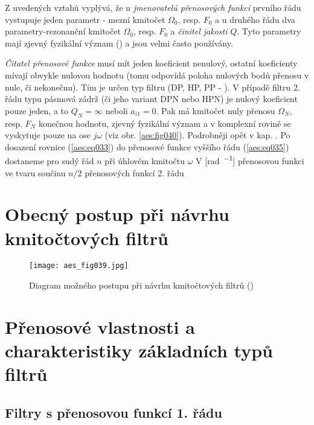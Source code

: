           Z uvedených vztahů vyplývá, že u \emph{jmenovatelů přenosových funkcí} prvního řádu
          vystupuje jeden parametr - mezní kmitočet \(\Omega_0\), resp. \(F_0\) a u druhého řádu dva
          parametry-rezonanční kmitočet \(\Omega_0\), resp. \(F_0\) a \emph{činitel jakosti} \(Q\).
          Tyto parametry mají zjevný fyzikální význam () a jsou velmi často
          používány. 
          
          \emph{Čitatel přenosové funkce} musí mít jeden koeficient nenulový, ostatní koeficienty
          mívají obvykle nulovou hodnotu (tomu odpovídá poloha nulových bodů přenosu v nule, či
          nekonečnu). Tím je určen typ filtru (DP, HP, PP - ). V případě filtru
          2. řádu typu pásmová zádrž (či jeho variant DPN nebo HPN) je nulový koeficient pouze
          jeden, a to \(Q_N = \infty\) neboli \(a_{i1} = 0\). Pak má kmitočet nuly přenosu
          \(\Omega_N\), resp. \(F_N\) konečnou hodnotu, zjevný fyzikální význam a v komplexní rovině
          se vyskytuje pouze na ose \(j\omega\) (viz obr. \ref{aes:fig040}). Podrobněji opět v kap.
          . Po dosazení rovnice (\ref{aes:eq033}) do přenosové funkce vyššího
          řádu (\ref{aes:eq035}) dostaneme pro sudý řád \(n\) při úhlovém kmitočtu \(\omega\) V
          [\si{\radian\per\sec}] přenosovou funkci ve tvaru součinu \(n/2\) přenosových funkcí 2.
          řádu
          

  \section{Obecný postup při návrhu kmitočtových filtrů}
    \begin{figure}[ht!]  %
      \centering
      \texttt{[image: aes\_fig039.jpg]}
      \caption{Diagram možného postupu při návrhu kmitočtových filtrů
              (\cite[s.~44]{HajekSedlacek2002})}
      \label{aes:fig039}    
    \end{figure}

  
  \section{Přenosové vlastnosti a charakteristiky základních typů filtrů}
    \subsection{Filtry s přenosovou funkcí 1. řádu}
